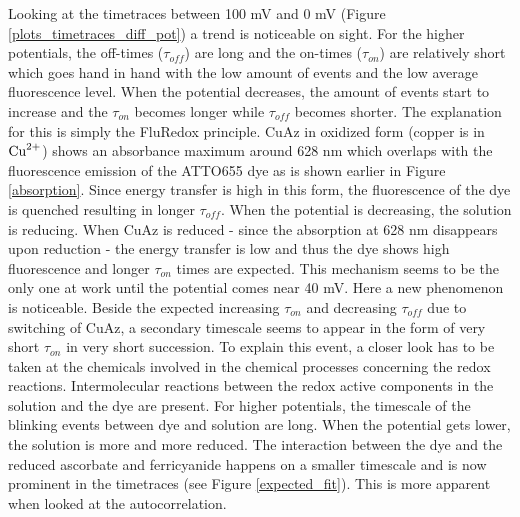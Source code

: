 \documentclass[twoside,single]{lion-msc}
\begin{document}
Looking at the timetraces between 100 mV and 0 mV (Figure \ref{plots_timetraces_diff_pot}) a trend is noticeable on sight. For the higher potentials, the off-times ($\tau_{off}$) are long and the on-times ($\tau_{on}$) are relatively short which goes hand in hand with the low amount of events and the low average fluorescence level. When the potential decreases, the amount of events start to increase and the $\tau_{on}$ becomes longer while $\tau_{off}$ becomes shorter. The explanation for this is simply the FluRedox principle. CuAz in oxidized form (copper is in $\textup{Cu}^{2+}$) shows an absorbance maximum around 628 nm which overlaps with the fluorescence emission of the ATTO655 dye as is shown earlier in Figure \ref{absorption}. Since energy transfer is high in this form, the fluorescence of the dye is quenched resulting in longer $\tau_{off}$. When the potential is decreasing, the solution is reducing. When CuAz is reduced - since the absorption at 628 nm disappears upon reduction - the energy transfer is low and thus the dye shows high fluorescence and longer $\tau_{on}$ times are expected. This mechanism seems to be the only one at work until the potential comes near 40 mV. Here a new phenomenon is noticeable. Beside the expected  increasing $\tau_{on}$ and decreasing $\tau_{off}$ due to switching of CuAz, a secondary timescale seems to appear in the form of very short $\tau_{on}$ in very short succession. To explain this event, a closer look has to be taken at the chemicals involved in the chemical processes concerning the redox reactions. Intermolecular reactions between the redox active components in the solution and the dye are present. For higher potentials, the timescale of the blinking events between dye and solution are long. When the potential gets lower, the solution is more and more reduced. The interaction between the dye and the reduced ascorbate and ferricyanide happens on a smaller timescale and is now prominent in the timetraces (see Figure \ref{expected_fit}). This is more apparent when looked at the autocorrelation. 
\end{document}
